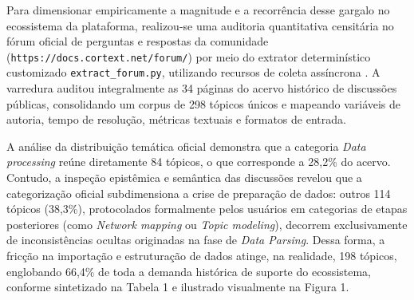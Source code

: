 \documentclass[
	oneside,
	a4paper,
	12pt,
	chapter=TITLE,
	section=TITLE,
	english,
	brazilian
]{abntex2}
\begin{document}
Para dimensionar empiricamente a magnitude e a recorrência desse gargalo no ecossistema da plataforma, realizou-se uma auditoria quantitativa censitária no fórum oficial de perguntas e respostas da comunidade (\texttt{https://docs.\allowbreak cortext.\allowbreak net/\allowbreak forum/}) por meio do extrator determinístico customizado \texttt{extract\_\allowbreak forum.\allowbreak py}, utilizando recursos de coleta assíncrona \cite{Crawl4AI2026}. A varredura auditou integralmente as 34 páginas do acervo histórico de discussões públicas, consolidando um corpus de 298 tópicos únicos e mapeando variáveis de autoria, tempo de resolução, métricas textuais e formatos de entrada.

A análise da distribuição temática oficial demonstra que a categoria \textit{Data processing} reúne diretamente 84 tópicos, o que corresponde a 28,2\% do acervo. Contudo, a inspeção epistêmica e semântica das discussões revelou que a categorização oficial subdimensiona a crise de preparação de dados: outros 114 tópicos (38,3\%), protocolados formalmente pelos usuários em categorias de etapas posteriores (como \textit{Network mapping} ou \textit{Topic modeling}), decorrem exclusivamente de inconsistências ocultas originadas na fase de \textit{Data Parsing}. Dessa forma, a fricção na importação e estruturação de dados atinge, na realidade, 198 tópicos, englobando 66,4\% de toda a demanda histórica de suporte do ecossistema, conforme sintetizado na Tabela 1 e ilustrado visualmente na Figura 1.
\end{document}
